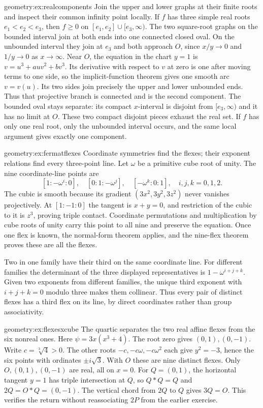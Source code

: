 \begin{solution}{geometry:ex:realcomponents}
\idea Join the upper and lower graphs at their finite roots and inspect their common infinity point locally.
\writeup If $f$ has three simple real roots $e_1<e_2<e_3$, then $f\ge0$ on $[e_1,e_2]\cup[e_3,\infty)$. The two square-root graphs on the bounded interval join at both ends into one connected closed oval. On the unbounded interval they join at $e_3$ and both approach $O$, since $x/y\to0$ and $1/y\to0$ as $x\to\infty$. Near $O$, the equation in the chart $y=1$ is $v=u^3+auv^2+bv^3$. Its derivative with respect to $v$ at zero is one after moving terms to one side, so the implicit-function theorem gives one smooth arc $v=v(u)$. Its two sides join precisely the upper and lower unbounded ends. Thus that projective branch is connected and is the second component. The bounded oval stays separate: its compact $x$-interval is disjoint from $[e_3,\infty)$ and it has no limit at $O$. These two compact disjoint pieces exhaust the real set. If $f$ has only one real root, only the unbounded interval occurs, and the same local argument gives exactly one component.
\end{solution}
\begin{solution}{geometry:ex:fermatflexes}
\idea Coordinate symmetries find the flexes; their exponent relations find every three-point line.
\writeup Let $\omega$ be a primitive cube root of unity. The nine coordinate-line points are
\[
[1:-\omega^i:0],\quad[0:1:-\omega^j],\quad[-\omega^k:0:1],
\quad i,j,k=0,1,2.
\]
The cubic is smooth because its gradient $(3x^2,3y^2,3z^2)$ never vanishes projectively. At $[1:-1:0]$ the tangent is $x+y=0$, and restriction of the cubic to it is $z^3$, proving triple contact. Coordinate permutations and multiplication by cube roots of unity carry this point to all nine and preserve the equation. Once one flex is known, the normal-form theorem applies, and the nine-flex theorem proves these are all the flexes.

Two in one family have their third on the same coordinate line. For different families the determinant of the three displayed representatives is $1-\omega^{i+j+k}$. Given two exponents from different families, the unique third exponent with $i+j+k=0$ modulo three makes them collinear. Thus every pair of distinct flexes has a third flex on its line, by direct coordinates rather than group associativity.
\end{solution}
\begin{solution}{geometry:ex:flexesxcube}
\idea The quartic separates the two real affine flexes from the six nonreal ones.
\writeup Here $\psi=3x(x^3+4)$. The root zero gives $(0,1),(0,-1)$. Write $c=\sqrt[3]4>0$. The other roots $-c,-c\omega,-c\omega^2$ each give $y^2=-3$, hence the six points with ordinates $\pm i\sqrt3$. With $O$ these are nine distinct flexes. Only $O,(0,1),(0,-1)$ are real, all on $x=0$. For $Q=(0,1)$, the horizontal tangent $y=1$ has triple intersection at $Q$, so $Q*Q=Q$ and $2Q=O*Q=(0,-1)$. The vertical chord from $2Q$ to $Q$ gives $3Q=O$. This verifies the return without reassociating $2P$ from the earlier exercise.
\end{solution}
